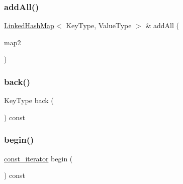 \mbox{\label{classLinkedHashMap_a9e6cd6e8273810ac99a612cdf14f084c}} 
\subsubsection{\texorpdfstring{add\+All()}{addAll()}}
{\footnotesize\ttfamily \mbox{\hyperlink{classLinkedHashMap}{Linked\+Hash\+Map}}$<$ Key\+Type, Value\+Type $>$ \& add\+All (\begin{DoxyParamCaption}\item[{const \mbox{\hyperlink{classLinkedHashMap}{Linked\+Hash\+Map}}$<$ Key\+Type, Value\+Type $>$ \&}]{map2 }\end{DoxyParamCaption})}

\mbox{\label{classLinkedHashMap_adfa4b8f8e4f5ecc11fb76a3efba70d70}} 
\subsubsection{\texorpdfstring{back()}{back()}}
{\footnotesize\ttfamily Key\+Type back (\begin{DoxyParamCaption}{ }\end{DoxyParamCaption}) const}

\mbox{\label{classLinkedHashMap_a29305669b60ca1680752e2fc3592ba99}} 
\subsubsection{\texorpdfstring{begin()}{begin()}}
{\footnotesize\ttfamily \mbox{\hyperlink{classLinkedHashMap_a40260d13231ddfc81d864ded4ad05c45}{const\+\_\+iterator}} begin (\begin{DoxyParamCaption}{ }\end{DoxyParamCaption}) const\hspace{0.3cm}{\ttfamily [inline]}}

\mbox{\label{classLinkedHashMap_ac8bb3912a3ce86b15842e79d0b421204}} 
